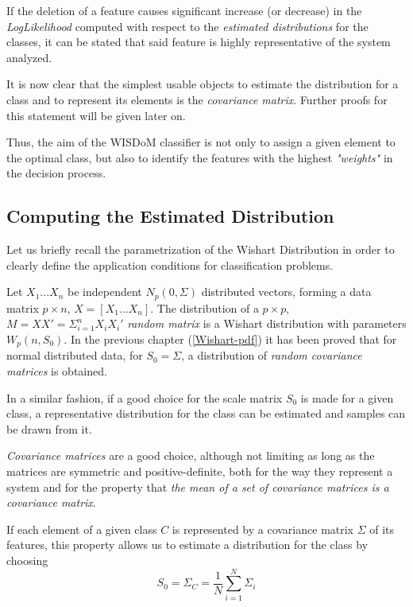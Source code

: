 \documentclass[12pt,openright,twoside,a4paper]{book}
\begin{document}
If the deletion of a feature causes significant increase (or decrease) in the \textit{LogLikelihood} computed with respect to the \textit{estimated distributions} for the classes, it can be stated that said feature is highly representative of the system analyzed.

It is now clear that the simplest usable objects to estimate the distribution for a class and to represent its elements is the \textit{covariance  matrix}. Further proofs for this statement will be given later on.

Thus, the aim of the WISDoM classifier is not only to assign a given element to the optimal class, but also to identify the features with the highest \textit{"weights"} in the decision process.

\subsection{Computing the Estimated Distribution}

Let us briefly recall the parametrization of the Wishart Distribution in order to clearly define the application conditions for classification problems.

Let $X_1...X_n$ be independent $N_p(0,\Sigma)$ distributed vectors, forming a data matrix $p\times n$, $X=[X_1...X_n]$.
The distribution of  a $p\times p$, $M=XX'=\Sigma^n_{i=1}X_iX_i'$ \textit{random matrix}  is a Wishart distribution with parameters $W_p (n, S_0 )$. In the previous chapter (\ref{Wishart-pdf}) it has been proved that for normal distributed data, for $S_0=\Sigma$, a distribution of \textit{random covariance matrices} is obtained.

In a similar fashion, if a good choice for the scale matrix $S_0$ is made for a given class, a representative distribution for the class can be estimated and samples can be drawn from it.

\textit{Covariance matrices} are a good choice, although not limiting as long as the matrices are symmetric and positive-definite, both for the way they represent a system and for the property that \textit{the mean of a set of covariance matrices is a covariance matrix}. 

If each element of a given class $C$ is represented by a covariance matrix $\Sigma$ of its features, this property allows us to estimate a distribution for the class by choosing 
\begin{equation}
S_0=\hat{\Sigma}_C=\frac{1}{N}\sum_{i=1}^N \Sigma_i
\label{Class-Scale}
\end{equation}
\end{document}

